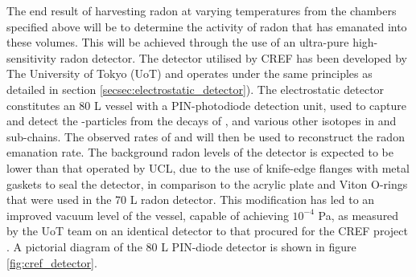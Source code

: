 The end result of harvesting radon at varying temperatures from the chambers specified above will be to determine the activity of radon that has emanated into these volumes. This will be achieved through the use of an ultra-pure high-sensitivity radon detector. The detector utilised by CREF has been developed by The University of Tokyo (UoT) and operates under the same principles as detailed in section \ref{secsec:electrostatic_detector}). The electrostatic detector constitutes an 80 L vessel with a PIN-photodiode detection unit, used to capture and detect the \alpha-particles from the decays of \PoTOE{}, \PoTOF{} and various other isotopes in \RnTTT{} and \RnTTZ{} sub-chains. The observed rates of \PoTOE{} and \PoTOF{} will then be used to reconstruct the radon emanation rate. The background radon levels of the detector is expected to be lower than that operated by UCL, due to the use of knife-edge flanges with metal gaskets to seal the detector, in comparison to the acrylic plate and Viton O-rings that were used in the 70 L radon detector. This modification has led to an improved vacuum level of the vessel, capable of achieving $10^{-4}$ Pa, as measured by the UoT team on an identical detector to that procured for the CREF project \cite{Hosokawa:2015koa}. A pictorial diagram of the 80 L PIN-diode detector is shown in figure \ref{fig:cref_detector}.
%
